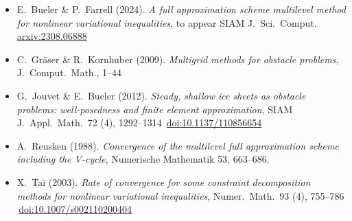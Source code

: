 
\newcommand{\sdoi}[1]{\,{\tiny \href{https://doi.org/#1}{doi:#1}}}
\begin{itemize}
\item E.~Bueler \& P.~Farrell (2024).  \emph{A full approximation scheme multilevel method for nonlinear variational inequalities}, to appear SIAM J.~Sci.~Comput. \, {\tiny \href{https://arxiv.org/abs/2308.06888}{arxiv:2308.06888}}
\item C.~Gr{\"a}ser \& R.~Kornhuber (2009). \emph{Multigrid methods for obstacle problems}, J.~Comput.~Math., 1--44
\item G.~Jouvet \& E.~Bueler (2012). \emph{Steady, shallow ice sheets as obstacle problems: well-posedness and finite element approximation}, SIAM J.~Appl.~Math.~72 (4), 1292--1314 \sdoi{10.1137/110856654}
\item A.~Reusken (1988). \emph{Convergence of the multilevel full approximation scheme including the V-cycle}, Numerische Mathematik 53, 663--686.
\item X.~Tai (2003). \emph{Rate of convergence for some constraint decomposition methods for nonlinear variational inequalities}, Numer.~Math.~93 (4), 755--786 \sdoi{10.1007/s002110200404}
\end{itemize}

